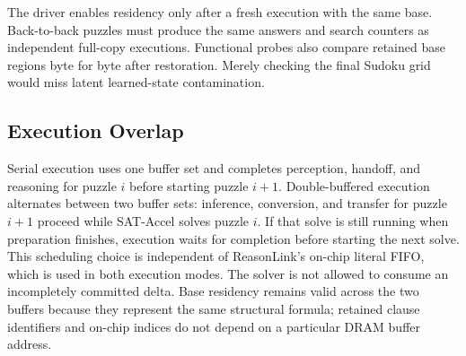 The driver enables residency only after a fresh execution with the same base. Back-to-back puzzles must produce the same answers and search counters as independent full-copy executions. Functional probes also compare retained base regions byte for byte after restoration. Merely checking the final Sudoku grid would miss latent learned-state contamination.


\subsection{Execution Overlap}
Serial execution uses one buffer set and completes perception, handoff, and reasoning for puzzle $i$ before starting puzzle $i+1$. Double-buffered execution alternates between two buffer sets: inference, conversion, and transfer for puzzle $i+1$ proceed while SAT-Accel solves puzzle $i$. If that solve is still running when preparation finishes, execution waits for completion before starting the next solve. This scheduling choice is independent of ReasonLink's on-chip literal FIFO, which is used in both execution modes. The solver is not allowed to consume an incompletely committed delta. Base residency remains valid across the two buffers because they represent the same structural formula; retained clause identifiers and on-chip indices do not depend on a particular DRAM buffer address.
